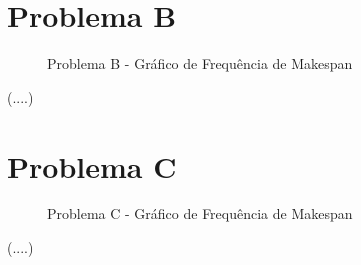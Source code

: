 \section{Problema B}
\begin{figure}
    \caption{Problema B - Gráfico de Frequência de Makespan}
    \label{fig:plobB-freq-mk}
    \begin{minipage}{.5\linewidth}
        \centering
        \subfloat[]{
            \label{plobB-freq-mk:a}
            \resizebox{\linewidth}{!}{}
        }
    \end{minipage}%
    \begin{minipage}{.5\linewidth}
        \centering
        \subfloat[]{
            \label{plobB-freq-mk:b}
            \resizebox{\linewidth}{!}{}
        }
    \end{minipage}\par\medskip
      \centering
      \subfloat[]{
        \label{plobB-freq-mk:c}
        \resizebox{.5\linewidth}{!}{}
      }
\end{figure}
(....)
\section{Problema C}
\begin{figure}
    \caption{Problema C - Gráfico de Frequência de Makespan}
    \label{fig:plobC-freq-mk}
    \begin{minipage}{.5\linewidth}
        \centering
        \subfloat[]{
            \label{plobC-freq-mk:a}
            \resizebox{\linewidth}{!}{}
        }
    \end{minipage}%
    \begin{minipage}{.5\linewidth}
        \centering
        \subfloat[]{
            \label{plobC-freq-mk:b}
            \resizebox{\linewidth}{!}{}
        }
    \end{minipage}\par\medskip
      \centering
      \subfloat[]{
        \label{plobC-freq-mk:c}
        \resizebox{.5\linewidth}{!}{}
      }
\end{figure}
(....)
